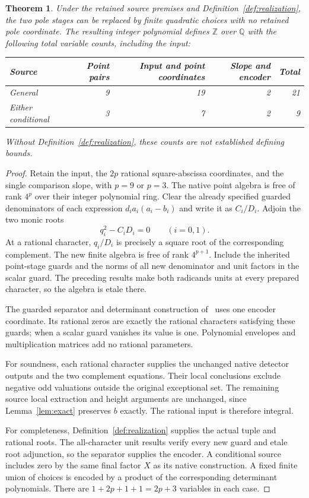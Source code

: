 \documentclass[11pt,a4paper]{article}
\newtheorem{theorem}{Theorem}[section]
\theoremstyle{definition}\newtheorem{definition}[theorem]{Definition}
\newcommand{\Q}{\mathbb Q}\newcommand{\Z}{\mathbb Z}
\begin{document}
\begin{theorem}\label{thm:count}
Under the retained source premises and
Definition~\ref{def:realization}, the two pole stages can be replaced
by finite quadratic choices with no retained pole coordinate. The
resulting integer polynomial defines $\Z$ over $\Q$ with the following
total variable counts, including the input:
\begin{center}
\begin{tabular}{lrrrr}\toprule
Source & Point pairs & Input and point coordinates & Slope and encoder & Total\\\midrule
General &9&19&2&21\\
Either conditional &3&7&2&9\\\bottomrule
\end{tabular}
\end{center}
Without Definition~\ref{def:realization}, these counts are not
established defining bounds.
\end{theorem}
\begin{proof}
Retain the input, the $2p$ rational square-abscissa coordinates,
and the single comparison slope, with $p=9$ or $p=3$.
The native point algebra is free of rank $4^p$ over their integer
polynomial ring. Clear the already specified guarded denominators
of each expression $d_i a_i(a_i-b_i)$ and write it as $C_i/D_i$.
Adjoin the two monic roots
\[
                         q_i^2-C_iD_i=0\qquad(i=0,1).
\]
At a rational character, $q_i/D_i$ is precisely a square root of
the corresponding complement. The new finite algebra is free of
rank $4^{p+1}$. Include the inherited point-stage guards and the
norms of all new denominator and unit factors in the scalar guard.
The preceding results make both radicands units at every prepared
character, so the algebra is etale there.

The guarded separator and determinant construction
of~\cite[Section 6]{Unit} uses one encoder coordinate. Its rational
zeros are exactly the rational characters satisfying these guards;
when a scalar guard vanishes its value is one. Polynomial envelopes
and multiplication matrices add no rational parameters.

For soundness, each rational character supplies the unchanged native
detector outputs and the two complement equations. Their local
conclusions exclude negative odd valuations outside the original
exceptional set. The remaining source local extraction and height
arguments are unchanged, since Lemma~\ref{lem:exact} preserves $b$
exactly. The rational input is therefore integral.

For completeness, Definition~\ref{def:realization} supplies the
actual tuple and rational roots. The all-character unit results
verify every new guard and etale root adjunction, so the separator
supplies the encoder. A conditional source includes zero by the same
final factor $X$ as its native construction. A fixed finite union
of choices is encoded by a product of the corresponding determinant
polynomials. There are $1+2p+1+1=2p+3$ variables in each case.
\end{proof}
\end{document}
